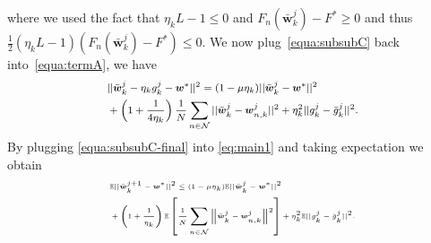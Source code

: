 where we used the fact that $\eta_kL-1 \leq 0$ and $F_{n}(\bar{\boldsymbol{w}}_k^j) - F^* \geq 0$ and thus $\frac{1}{2}(\eta_kL-1)(F_{n}(\bar{\boldsymbol{w}}_k^j) - F^*) \leq 0$. We now plug~\eqref{equa:subsubC} back into~\eqref{equa:termA}, we have
\begin{equation}\footnotesize  \label{equa:subsubC-final}
\begin{aligned}
&||\bar{\boldsymbol{w}}_k^j - \eta_kg_k^j  - \boldsymbol{w}^*||^2 
= (1-\mu\eta_k)||\bar{\boldsymbol{w}}_k^j - \boldsymbol{w}^*||^2  
\\&+ \left(1+\frac{1}{4\eta_k}\right) \frac{1}{N}\sum_{n\in\mathcal{N}}||\bar{\boldsymbol{w}}_k^j-\boldsymbol{w}_{n,k}^j||^2 +\eta_k^2||g_k^j - \bar{g}_k^j||^2.
\end{aligned}
\end{equation}
By plugging \eqref{equa:subsubC-final} into \eqref{eq:main1} and taking expectation we obtain
\begin{equation} \tiny
\begin{aligned}
&\mathbb{E}||\bar{\boldsymbol{w}}_k^{j+1} - \boldsymbol{w}^*||^2  \leq (1-\mu\eta_k)\mathbb{E}||\bar{\boldsymbol{w}}_k^j - \boldsymbol{w}^*||^2  
\\&+ \left(1+\frac{1}{\eta_k}\right) \mathbb{E} \left[ \frac{1}{N}\sum_{n\in\mathcal{N}}\Big\Vert\bar{\boldsymbol{w}}_k^j-\boldsymbol{w}_{n,k}^j\Big\Vert^2  \right]  +\eta_k^2\mathbb{E}||g_k^j - \bar{g}_k^j||^2.  
\end{aligned}
\end{equation}

